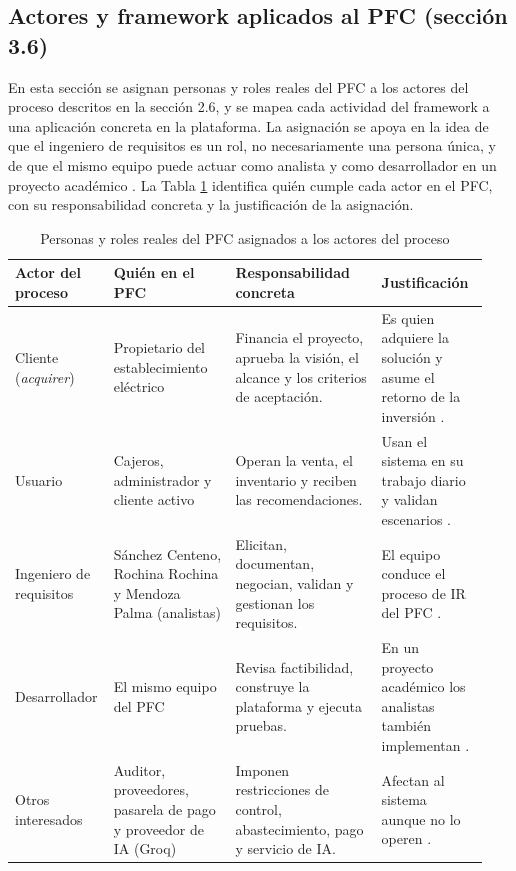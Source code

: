 \documentclass[onecolumn,12pt]{IEEEtran}
\begin{document}
\subsection{Actores y framework aplicados al PFC (secci\'on 3.6)}
En esta secci\'on se asignan personas y roles reales del PFC a los actores del proceso descritos en la secci\'on 2.6, y se mapea cada actividad del framework a una aplicaci\'on concreta en la plataforma. La asignaci\'on se apoya en la idea de que el ingeniero de requisitos es un rol, no necesariamente una persona \'unica, y de que el mismo equipo puede actuar como analista y como desarrollador en un proyecto acad\'emico \cite{pohl2025,ireb2023}. La Tabla \ref{tab:actores-pfc} identifica qui\'en cumple cada actor en el PFC, con su responsabilidad concreta y la justificaci\'on de la asignaci\'on.

\begin{table}[htbp]
\caption{Personas y roles reales del PFC asignados a los actores del proceso}
\label{tab:actores-pfc}
\centering
\footnotesize
\begin{tabular}{@{}p{0.17\linewidth}p{0.25\linewidth}p{0.30\linewidth}p{0.22\linewidth}@{}}
\toprule
\textbf{Actor del proceso} & \textbf{Qui\'en en el PFC} & \textbf{Responsabilidad concreta} & \textbf{Justificaci\'on}\\
\midrule
Cliente (\emph{acquirer}) & Propietario del establecimiento el\'ectrico & Financia el proyecto, aprueba la visi\'on, el alcance y los criterios de aceptaci\'on. & Es quien adquiere la soluci\'on y asume el retorno de la inversi\'on \cite{iso29148}.\\
Usuario & Cajeros, administrador y cliente activo & Operan la venta, el inventario y reciben las recomendaciones. & Usan el sistema en su trabajo diario y validan escenarios \cite{iso29148,pohl2025}.\\
Ingeniero de requisitos & S\'anchez Centeno, Rochina Rochina y Mendoza Palma (analistas) & Elicitan, documentan, negocian, validan y gestionan los requisitos. & El equipo conduce el proceso de IR del PFC \cite{pohl2025,ireb2023}.\\
Desarrollador & El mismo equipo del PFC & Revisa factibilidad, construye la plataforma y ejecuta pruebas. & En un proyecto acad\'emico los analistas tambi\'en implementan \cite{iso12207}.\\
Otros interesados & Auditor, proveedores, pasarela de pago y proveedor de IA (Groq) & Imponen restricciones de control, abastecimiento, pago y servicio de IA. & Afectan al sistema aunque no lo operen \cite{iso29148,pmbok7}.\\
\bottomrule
\end{tabular}
\end{table}
\end{document}
